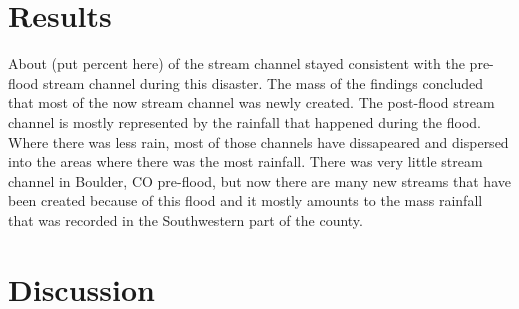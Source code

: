\documentclass[twoside]{article}
\begin{document}
\begin{multicols}{2}

\section{Results}


About (put percent here) of the stream channel stayed consistent with the pre-flood stream channel during this disaster. The mass of the findings concluded that most of the now stream channel was newly created. The post-flood stream channel is mostly represented by the rainfall that happened during the flood. Where there was less rain, most of those channels have dissapeared and dispersed into the areas where there was the most rainfall. There was very little stream channel in Boulder, CO pre-flood, but now there are many new streams that have been created because of this flood and it mostly amounts to the mass rainfall that was recorded in the Southwestern part of the county. 




\section{Discussion}


\end{multicols}
\end{document}
